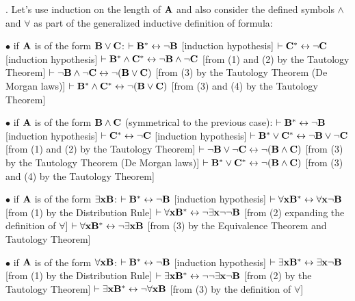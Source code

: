 \medskip

. Let's use induction on the length of ${\bf A}$ and also consider the defined
symbols $\land$ and $\forall$ as part of the generalized inductive definition of
formula:
\item{$\bullet$} if ${\bf A}$ is of the form ${\bf B} \lor {\bf C}$:
 $\vdash {\bf B}^* \leftrightarrow \neg {\bf B}$ \hfill [induction hypothesis]
 $\vdash {\bf C}^* \leftrightarrow \neg {\bf C}$ \hfill [induction hypothesis]
 $\vdash {\bf B}^* \land {\bf C}^* \leftrightarrow \neg {\bf B} \land \neg {\bf C}$ \hfill [from (1) and (2) by the Tautology Theorem]
 $\vdash \neg {\bf B} \land \neg {\bf C} \leftrightarrow \neg ({\bf B} \lor {\bf C})$ \hfill [from (3) by the Tautology Theorem (De Morgan laws)]
 $\vdash {\bf B}^* \land {\bf C}^* \leftrightarrow \neg ({\bf B} \lor {\bf C})$ \hfill [from (3) and (4) by the Tautology Theorem]

\item{$\bullet$} if ${\bf A}$ is of the form ${\bf B} \land {\bf C}$ (symmetrical to the previous case):
 $\vdash {\bf B}^* \leftrightarrow \neg {\bf B}$ \hfill [induction hypothesis]
 $\vdash {\bf C}^* \leftrightarrow \neg {\bf C}$ \hfill [induction hypothesis]
 $\vdash {\bf B}^* \lor {\bf C}^* \leftrightarrow \neg {\bf B} \lor \neg {\bf C}$ \hfill [from (1) and (2) by the Tautology Theorem]
 $\vdash \neg {\bf B} \lor \neg {\bf C} \leftrightarrow \neg ({\bf B} \land {\bf C})$ \hfill [from (3) by the Tautology Theorem (De Morgan laws)]
 $\vdash {\bf B}^* \lor {\bf C}^* \leftrightarrow \neg ({\bf B} \land {\bf C})$ \hfill [from (3) and (4) by the Tautology Theorem]

\item{$\bullet$} if ${\bf A}$ is of the form $\exists{\bf x}{\bf B}$:
 $\vdash {\bf B}^* \leftrightarrow \neg {\bf B}$ \hfill [induction hypothesis]
 $\vdash \forall{\bf x}{\bf B}^* \leftrightarrow \forall{\bf x} \neg {\bf B}$ \hfill [from (1) by the Distribution Rule]
 $\vdash \forall{\bf x}{\bf B}^* \leftrightarrow \neg\exists{\bf x} \neg\neg {\bf B}$ \hfill [from (2) expanding the definition of $\forall$]
 $\vdash \forall{\bf x}{\bf B}^* \leftrightarrow \neg\exists{\bf x} {\bf B}$ \hfill [from (3) by the Equivalence Theorem and Tautology Theorem]

\item{$\bullet$} if ${\bf A}$ is of the form $\forall{\bf x}{\bf B}$:
 $\vdash {\bf B}^* \leftrightarrow \neg {\bf B}$ \hfill [induction hypothesis]
 $\vdash \exists{\bf x}{\bf B}^* \leftrightarrow \exists{\bf x} \neg {\bf B}$ \hfill [from (1) by the Distribution Rule]
 $\vdash \exists{\bf x}{\bf B}^* \leftrightarrow \neg\neg \exists{\bf x} \neg {\bf B}$ \hfill [from (2) by the Tautology Theorem]
 $\vdash \exists{\bf x}{\bf B}^* \leftrightarrow \neg \forall{\bf x} {\bf B}$ \hfill [from (3) by the definition of $\forall$]

